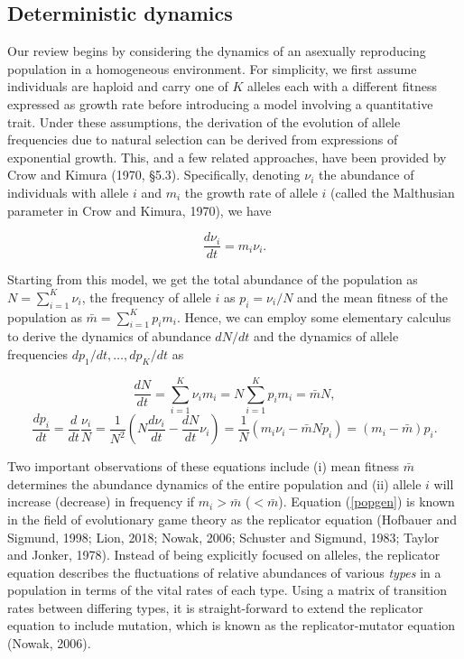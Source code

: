 \documentclass[]{elsarticle} %
\begin{document}
\hypertarget{deterministic-dynamics}{%
\subsection{\texorpdfstring{Deterministic dynamics
\label{deterministic}}{Deterministic dynamics }}\label{deterministic-dynamics}}

Our review begins by considering the dynamics of an asexually
reproducing population in a homogeneous environment. For simplicity, we
first assume individuals are haploid and carry one of \(K\) alleles each
with a different fitness expressed as growth rate before introducing a
model involving a quantitative trait. Under these assumptions, the
derivation of the evolution of allele frequencies due to natural
selection can be derived from expressions of exponential growth. This,
and a few related approaches, have been provided by Crow and Kimura
(1970, \S 5.3). Specifically, denoting \(\nu_i\) the abundance of
individuals with allele \(i\) and \(m_i\) the growth rate of allele
\(i\) (called the Malthusian parameter in Crow and Kimura, 1970), we
have

\begin{equation}\label{first}
\frac{d\nu_i}{dt}=m_i\nu_i.
\end{equation}

Starting from this model, we get the total abundance of the population
as \(N=\sum_{i=1}^K\nu_i\), the frequency of allele \(i\) as
\(p_i=\nu_i/N\) and the mean fitness of the population as
\(\bar m=\sum_{i=1}^Kp_im_i\). Hence, we can employ some elementary
calculus to derive the dynamics of abundance \(dN/dt\) and the dynamics
of allele frequencies \(dp_1/dt,\dots,dp_K/dt\) as

\begin{equation}
\frac{dN}{dt}=\sum_{i=1}^K\nu_im_i=N\sum_{i=1}^Kp_im_i=\bar mN,
\end{equation} \begin{equation}\label{popgen}
\frac{dp_i}{dt}=\frac{d}{dt}\frac{\nu_i}{N}=\frac{1}{N^2}\left(N\frac{d\nu_i}{dt}-\frac{dN}{dt}\nu_i\right)
=\frac{1}{N}\left(m_i\nu_i-\bar m Np_i\right)=(m_i-\bar m)p_i.
\end{equation}

Two important observations of these equations include (i) mean fitness
\(\bar m\) determines the abundance dynamics of the entire population
and (ii) allele \(i\) will increase (decrease) in frequency if
\(m_i>\bar m\) (\(<\bar m\)). Equation (\ref{popgen}) is known in the
field of evolutionary game theory as the replicator equation (Hofbauer
and Sigmund, 1998; Lion, 2018; Nowak, 2006; Schuster and Sigmund, 1983;
Taylor and Jonker, 1978). Instead of being explicitly focused on
alleles, the replicator equation describes the fluctuations of relative
abundances of various \emph{types} in a population in terms of the vital
rates of each type. Using a matrix of transition rates between differing
types, it is straight-forward to extend the replicator equation to
include mutation, which is known as the replicator-mutator equation
(Nowak, 2006).
\end{document}
